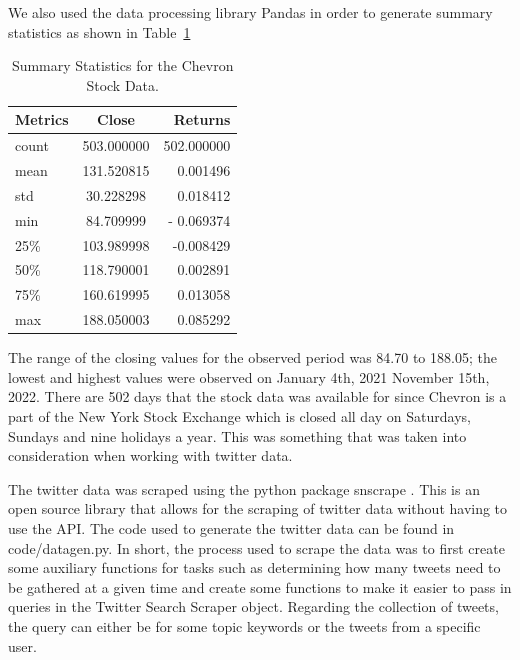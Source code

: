 \documentclass[12pt, letterpaper, titlepage]{article}
\newcommand{\jy}[1]{\textcolor{blue}{JY: #1}}
\begin{document}
We also used the data processing library Pandas in order to generate summary statistics as shown in Table~\ref{tab:sumstat}
\begin{table}[tbp]
  \begin{center}
    \caption{Summary Statistics for the Chevron Stock Data.}
    \label{tab:sumstat}
    \begin{tabular}{l|c|r} %
      \textbf{Metrics} & \textbf{Close} & \textbf{Returns}\\
      \hline
      count & 503.000000 & 502.000000\\
      mean & 131.520815 & 0.001496\\
      std & 30.228298 & 0.018412\\
      min & 84.709999	 & - 0.069374\\
      25\% & 103.989998 & -0.008429\\
      50\% & 118.790001 & 0.002891\\
      75\% & 160.619995 & 0.013058\\
      max & 188.050003 & 0.085292\\
    \end{tabular}
  \end{center}
\end{table}



The range of the closing values for the observed period was 84.70 to 188.05; the lowest and highest values were observed on January 4th, 2021 November 15th, 2022. There are 502 days that the stock data was available for since Chevron is a part of the New York Stock Exchange which is closed all day on Saturdays, Sundays and nine holidays a year. This was something that was taken into consideration when working with twitter data. 


The twitter data was scraped using the python package snscrape \citep{justanotherarchivist_2022}. This is an open source library that allows for the scraping of twitter data without having to use the API. The code used to generate the twitter data can be found in code/datagen.py. In short, the process used to scrape the data was to first create some auxiliary functions for tasks such as determining how many tweets need to be gathered at a given time and create some functions to make it easier to pass in queries in the Twitter Search Scraper object. Regarding the collection of tweets, the query can either be for some topic keywords or the tweets from a specific user. 
\end{document}
